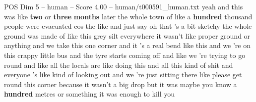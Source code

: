 \begin{textsample}{POS Dim 5 – human – Score 4.00 – human/t000591\_human.txt}  \label{ex:f5_pos_012}
yeah and this was like \textbf{two} or \textbf{three} \textbf{months} later the whole town of like a \textbf{hundred} thousand people were evacuated cos the like and just say oh that 's a bit sketchy the whole ground was made of like this grey silt everywhere it wasn't like proper ground or anything and we take this one corner and it 's a real bend like this and we 're on this crappy little bus and the tyre starts coming off and like we 're trying to go round and like all the locals are like doing this and all this kind of shit and everyone 's like kind of looking out and we 're just sitting there like please get round this corner because it wasn't a big drop but it was maybe you know a \textbf{hundred} metres or something it was enough to kill you

\end{textsample}
